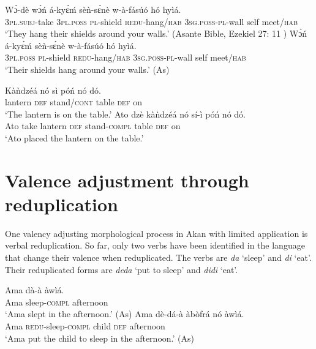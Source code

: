 \documentclass[output=paper]{langsci/langscibook}
\begin{document}
\ea\label{ex:45.osam}
\ea\label{ex:45a.osam}
\gll   Wɔ̀-dè    wɔ̀ń    á-ky\'{ɛ}ḿ   sèǹ-s\'{ɛ}nè w-à-fásúó    hó   hyìá. \\
       \textsc{3pl.subj}-take  \textsc{3pl.poss}  \textsc{pl}-shield  \textsc{redu}-hang/\textsc{hab} \textsc{3sg.poss-pl}-wall  self  meet/\textsc{hab}  \\
\glt `They hang their shields around your walls.' (Asante Bible, Ezekiel 27: 11 \citep{bible1964})
\ex\label{ex:45b.osam}
\gll   Wɔ̀ń    á-ky\'{ɛ}ḿ    sèǹ-s\'{ɛ}nè     w-à-fásúó hó  hyìá.\\
       \textsc{3pl.poss}  \textsc{pl}-shield  \textsc{redu}-hang/\textsc{hab}  \textsc{3sg.poss-pl}-wall self  meet/\textsc{hab}\\
\glt `Their shields hang around your walls.' (As)
\z 
\z 

\ea\label{ex:46.osam}
\ea\label{ex:46a.osam}
\gll Kàǹdzéá  nó  sì    póń  nó  dó.\\
       lantern    \textsc{def}  stand/\textsc{cont}  table  \textsc{def}  on\\
\glt `The lantern is on the table.'
\ex\label{ex:46b.osam}
\gll   Ato  dzè  kàǹdzéá  nó  sí-ì    póń  nó  dó.\\
       Ato  take  lantern    \textsc{def}  stand-\textsc{compl}  table  \textsc{def}  on\\
\glt `Ato placed the lantern on the table.'
\z 
\z 


\section{Valence adjustment through reduplication}\label{§6:valence.osam}

One valency adjusting morphological process in Akan with limited application is verbal reduplication. So far, only two verbs have been identified in the language that change their valence when reduplicated. The verbs are \textit{da} `sleep' and \textit{di} `eat'. Their reduplicated forms are \textit{deda} `put to sleep' and \textit{didi} `eat'.

\ea\label{ex:47.osam}
\ea\label{ex:47a.osam}
\gll  Ama  dà-à    àwìá.\\
       Ama  sleep-\textsc{compl}  afternoon\\
\glt   `Ama slept in the afternoon.' (As)
\ex\label{ex:47b.osam}
\gll   Ama  dè-dá-à    àbòfrá    nó  àwìá.\\
       Ama  \textsc{redu}-sleep\textsc{-compl}  child    \textsc{def}  afternoon\\
\glt   `Ama put the child to sleep in the afternoon.' (As)
\z 
\z 
\end{document}
